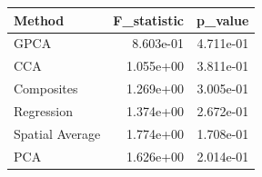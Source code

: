 \begin{tabular}{lrr}
\toprule
Method & F_statistic & p_value \\
\midrule
GPCA & 8.603e-01 & 4.711e-01 \\
CCA & 1.055e+00 & 3.811e-01 \\
Composites & 1.269e+00 & 3.005e-01 \\
Regression & 1.374e+00 & 2.672e-01 \\
Spatial Average & 1.774e+00 & 1.708e-01 \\
PCA & 1.626e+00 & 2.014e-01 \\
\bottomrule
\end{tabular}
